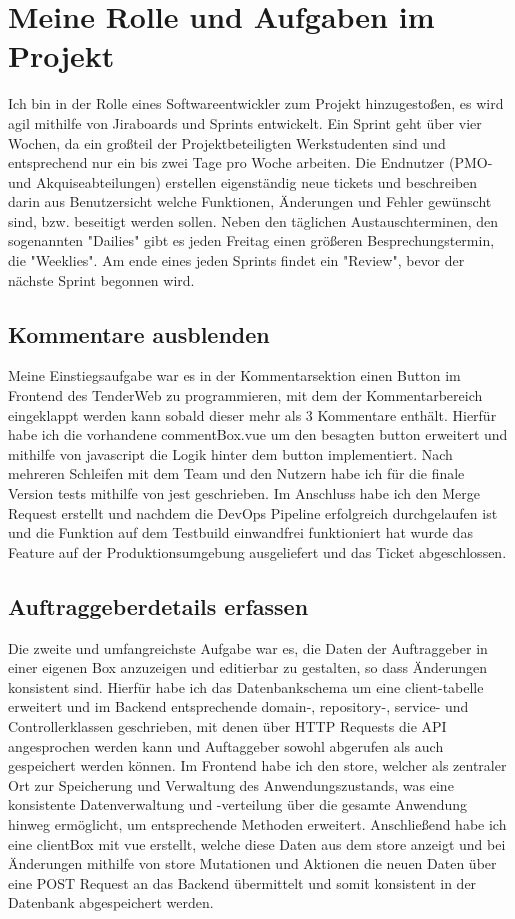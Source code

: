 \section{Meine Rolle und Aufgaben im Projekt}
Ich bin in der Rolle eines Softwareentwickler zum Projekt hinzugestoßen, es wird agil mithilfe von Jiraboards und
Sprints entwickelt. Ein Sprint geht über vier Wochen, da ein großteil der Projektbeteiligten Werkstudenten sind und
entsprechend nur ein bis zwei Tage pro Woche arbeiten. Die Endnutzer (PMO- und Akquiseabteilungen) erstellen
eigenständig neue tickets und beschreiben darin aus Benutzersicht welche Funktionen, Änderungen und Fehler gewünscht
sind, bzw. beseitigt werden sollen. Neben den täglichen Austauschterminen, den sogenannten "Dailies" gibt es jeden
Freitag einen größeren Besprechungstermin, die "Weeklies". Am ende eines jeden Sprints findet ein "Review", bevor der
nächste Sprint begonnen wird.

\subsection{Kommentare ausblenden}
Meine Einstiegsaufgabe war es in der Kommentarsektion einen Button im Frontend des TenderWeb zu programmieren, mit dem
der Kommentarbereich eingeklappt werden kann sobald dieser mehr als 3 Kommentare enthält. Hierfür habe ich die
vorhandene commentBox.vue um den besagten button erweitert und mithilfe von javascript die Logik hinter dem button
implementiert. Nach mehreren Schleifen mit dem Team und den Nutzern habe ich für die finale Version tests mithilfe von
jest geschrieben. Im Anschluss habe ich den Merge Request erstellt und nachdem die DevOps Pipeline erfolgreich
durchgelaufen ist und die Funktion auf dem Testbuild einwandfrei funktioniert hat wurde das Feature auf der
Produktionsumgebung ausgeliefert und das Ticket abgeschlossen.

\subsection{Auftraggeberdetails erfassen}
Die zweite und umfangreichste Aufgabe war es, die Daten der Auftraggeber in einer eigenen Box anzuzeigen und editierbar
zu gestalten, so dass Änderungen konsistent sind. Hierfür habe ich das Datenbankschema um eine client-tabelle erweitert
und im Backend entsprechende domain-, repository-, service- und Controllerklassen geschrieben, mit denen über HTTP
Requests die API angesprochen werden kann und Auftaggeber sowohl abgerufen als auch gespeichert werden können. Im
Frontend habe ich den store, welcher als zentraler Ort zur Speicherung und Verwaltung des Anwendungszustands, was eine
konsistente Datenverwaltung und -verteilung über die gesamte Anwendung hinweg ermöglicht, um entsprechende Methoden
erweitert. Anschließend habe ich eine clientBox mit vue erstellt, welche diese Daten aus dem store anzeigt und bei
Änderungen mithilfe von store Mutationen und Aktionen die neuen Daten über eine POST Request an das Backend übermittelt
und somit konsistent in der Datenbank abgespeichert werden. 


